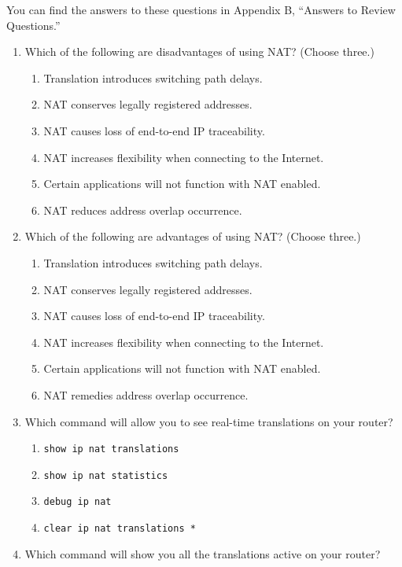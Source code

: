 You can find the answers to these questions in Appendix B, ``Answers to
Review Questions.''

\begin{enumerate}
\item
  Which of the following are disadvantages of using NAT? (Choose three.)

  \begin{enumerate}
  \tightlist
  \item
    Translation introduces switching path delays.
  \item
    NAT conserves legally registered addresses.
  \item
    NAT causes loss of end-to-end IP traceability.
  \item
    NAT increases flexibility when connecting to the Internet.
  \item
    Certain applications will not function with NAT enabled.
  \item
    NAT reduces address overlap occurrence.
  \end{enumerate}
\item
  Which of the following are advantages of using NAT? (Choose three.)

  \begin{enumerate}
  \tightlist
  \item
    Translation introduces switching path delays.
  \item
    NAT conserves legally registered addresses.
  \item
    NAT causes loss of end-to-end IP traceability.
  \item
    NAT increases flexibility when connecting to the Internet.
  \item
    Certain applications will not function with NAT enabled.
  \item
    NAT remedies address overlap occurrence.
  \end{enumerate}
\item
  Which command will allow you to see real-time translations on your
  router?

  \begin{enumerate}
  \tightlist
  \item
    \texttt{show\ ip\ nat\ translations}
  \item
    \texttt{show\ ip\ nat\ statistics}
  \item
    \texttt{debug\ ip\ nat}
  \item
    \texttt{clear\ ip\ nat\ translations\ *}
  \end{enumerate}
\item
  Which command will show you all the translations active on your
  router?


\end{enumerate}
